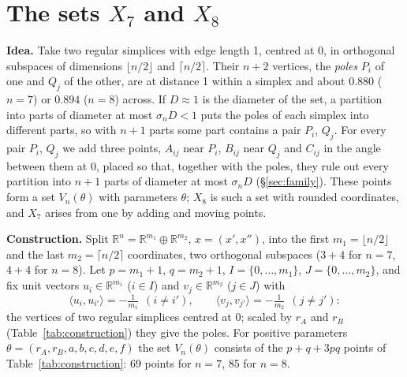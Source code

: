 \documentclass[10pt,a4paper,reqno]{amsart}
\newcommand{\R}{\mathbb R}
\begin{document}
\section{The sets $X_7$ and $X_8$}\label{sec:sets}

\noindent\textbf{Idea.} Take two regular simplices with edge length 1, centred at $0$, in orthogonal subspaces of dimensions $\lfloor n/2\rfloor$ and $\lceil n/2\rceil$. Their $n+2$ vertices, the \emph{poles} $P_i$ of one and $Q_j$ of the other, are at distance 1 within a simplex and about $0.880$ ($n=7$) or $0.894$ ($n=8$) across. If $D\approx1$ is the diameter of the set, a partition into parts of diameter at most $\sigma_nD<1$ puts the poles of each simplex into different parts, so with $n+1$ parts some part contains a pair $P_i$, $Q_j$. For every pair $P_i$, $Q_j$ we add three points, $A_{ij}$ near $P_i$, $B_{ij}$ near $Q_j$ and $C_{ij}$ in the angle between them at $0$, placed so that, together with the poles, they rule out every partition into $n+1$ parts of diameter at most $\sigma_nD$ (\S\ref{sec:family}). These points form a set $V_n(\theta)$ with parameters $\theta$; $X_8$ is such a set with rounded coordinates, and $X_7$ arises from one by adding and moving points.

\smallskip
\noindent\textbf{Construction.} Split $\R^n=\R^{m_1}\oplus\R^{m_2}$, $x=(x',x'')$, into the first $m_1=\lfloor n/2\rfloor$ and the last $m_2=\lceil n/2\rceil$ coordinates, two orthogonal subspaces ($3+4$ for $n=7$, $4+4$ for $n=8$). Let $p=m_1+1$, $q=m_2+1$, $I=\{0,\dots,m_1\}$, $J=\{0,\dots,m_2\}$, and fix unit vectors $u_i\in\R^{m_1}$ ($i\in I$) and $v_j\in\R^{m_2}$ ($j\in J$) with
\[
\langle u_i,u_{i'}\rangle=-\tfrac{1}{m_1}\ \ (i\ne i'),\qquad \langle v_j,v_{j'}\rangle=-\tfrac{1}{m_2}\ \ (j\ne j'):
\]
the vertices of two regular simplices centred at $0$; scaled by $r_A$ and $r_B$ (Table~\ref{tab:construction}) they give the poles. For positive parameters $\theta=(r_A,r_B,a,b,c,d,e,f)$ the set $V_n(\theta)$ consists of the $p+q+3pq$ points of Table~\ref{tab:construction}: 69 points for $n=7$, 85 for $n=8$.
\end{document}
